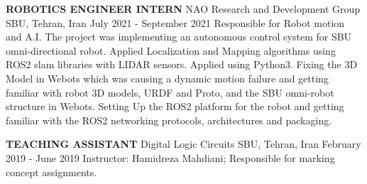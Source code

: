 \begin{cventries}
    \cventry
    {\textbf{ROBOTICS ENGINEER INTERN}}
    {NAO Research and Development Group}
    {SBU, Tehran, Iran}
    {July 2021 - September 2021}
    {Responsible for Robot motion and A.I. 
    \newline The project was implementing an autonomous control system for SBU omni-directional robot. Applied Localization and Mapping algorithms using ROS2 slam libraries with LIDAR sensors. 
    \newline Applied  using Python3. 
    \newline Fixing the 3D Model in Webots which was causing a dynamic motion failure and getting familiar with robot 3D models, URDF and Proto, and the SBU omni-robot structure in Webots. 
    \newline Setting Up the ROS2 platform for the robot and getting familiar with the ROS2 networking protocols, architectures and packaging.}
\end{cventries}

\begin{cventries}
    \cventry
    {\textbf{TEACHING ASSISTANT}}
    {Digital Logic Circuits}
    {SBU, Tehran, Iran}
    {February 2019 - June 2019}
    {Instructor: Hamidreza Mahdiani; Responsible for marking concept assignments.}
\end{cventries}